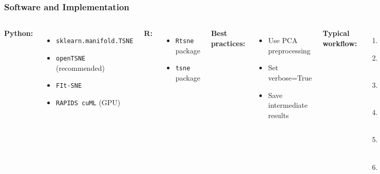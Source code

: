 \documentclass[aspectratio=169]{beamer}
\begin{document}
\begin{frame}
\frametitle{Software and Implementation}
\begin{columns}[T]
\textbf{Python:}
\begin{itemize}
\small
\item \texttt{sklearn.manifold.TSNE}
\item \texttt{openTSNE} (recommended)
\item \texttt{FIt-SNE}
\item \texttt{RAPIDS cuML} (GPU)
\end{itemize}

\vspace{0.3cm}
\textbf{R:}
\begin{itemize}
\small
\item \texttt{Rtsne} package
\item \texttt{tsne} package
\end{itemize}

\vspace{0.3cm}
\textbf{Best practices:}
\begin{itemize}
\small
\item Use PCA preprocessing
\item Set verbose=True
\item Save intermediate results
\end{itemize}

\textbf{Typical workflow:}
\begin{enumerate}
\small
\item Load data
\item Standardize features
\item PCA to 50D
\item t-SNE with perp=30
\item Try perp=\{5,50,100\}
\item Validate clusters
\end{enumerate}

\vspace{0.3cm}
\textbf{Performance tips:}
\begin{itemize}
\small
\item Use float32, not float64
\item Barnes-Hut for $n > 5000$
\item GPU for $n > 50000$
\item Subsample if needed
\end{itemize}
\end{columns}
\end{frame}
\end{document}
